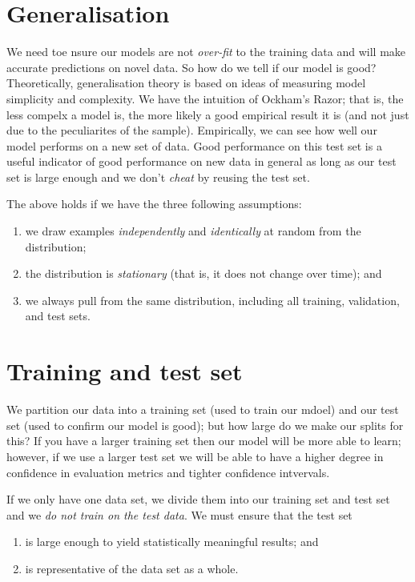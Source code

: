 \section{Generalisation}

We need toe nsure our models are not \emph{over-fit} to the
training data and will make accurate predictions on novel data.
So how do we tell if our model is good?
Theoretically, generalisation theory is based
on ideas of measuring model simplicity and complexity.
We have the intuition of Ockham's Razor; that is,
the less compelx a model is, the more likely a good
empirical result it is (and not just due to the peculiarites of the
sample).
Empirically, we can see how well our model performs on
a new set of data. 
Good performance on this test set is a useful indicator
of good performance on new data in general as long as our
test set is large enough and we don't \emph{cheat} by reusing the
test set.

The above holds if we have the three following assumptions:
\begin{enumerate}
    \item we draw examples \emph{independently} and 
        \emph{identically} at random from the distribution;
    \item the distribution is \emph{stationary}
        (that is, it does not change over time); and
    \item we always pull from the same distribution,
        including all training, validation, and test sets.
\end{enumerate}

\section{Training and test set}

We partition our data into a training set
(used to train our mdoel)
and our test set
(used to confirm our model is good);
but how large do we make our splits for this?
If you have a larger training set then our model will
be more able to learn; 
however, if we use a larger test set
we will be able to have a higher degree in confidence in
evaluation metrics and tighter confidence intvervals.

If we only have one data set, we divide them into our training
set and test set and we \emph{do not train on the test data}.
We must ensure that the test set
\begin{enumerate}
    \item is large enough to yield statistically meaningful results; 
        and
    \item is representative of the data set as a whole.
\end{enumerate}


